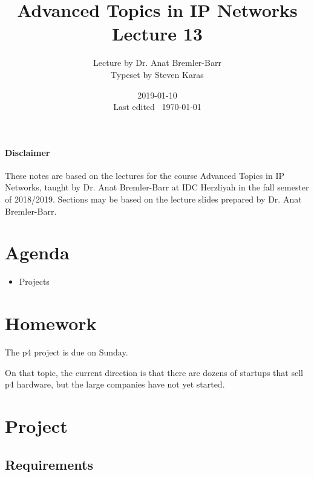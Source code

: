 \documentclass{idc_msc}
\title{Advanced Topics in IP Networks \\\large Lecture 13}
\date{2019-01-10 \\ Last edited \currenttime\ \today}
\author{Lecture by Dr. Anat Bremler-Barr\\Typeset by Steven Karas}
\begin{document}
\maketitle

\paragraph{Disclaimer}

These notes are based on the lectures for the course Advanced Topics in IP Networks, taught by Dr. Anat Bremler-Barr at IDC Herzliyah in the fall semester of 2018/2019.
Sections may be based on the lecture slides prepared by Dr. Anat Bremler-Barr.

\nocite{Varghese:2004:NAI:1203994}
\nocite{Crovella:2006:IMI:1196480}
\nocite{Kurose:2002:CNT:549735}

\section{Agenda}

\begin{itemize}
  \item Projects
\end{itemize}

\section{Homework}

The p4 project is due on Sunday.

On that topic, the current direction is that there are dozens of startups that sell p4 hardware, but the large companies have not yet started.

\section{Project}

\subsection{Requirements}
\end{document}
